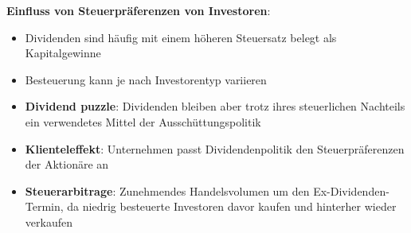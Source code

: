 \bigskip
\textbf{Einfluss von Steuerpräferenzen von Investoren}:
\begin{itemize}
	\item Dividenden sind häufig mit einem höheren Steuersatz belegt als Kapitalgewinne
	\item Besteuerung kann je nach Investorentyp variieren
	\item \textbf{Dividend puzzle}: Dividenden bleiben aber trotz ihres steuerlichen Nachteils ein verwendetes Mittel der Ausschüttungspolitik
	\item \textbf{Klienteleffekt}: Unternehmen passt Dividendenpolitik den Steuerpräferenzen der Aktionäre an
	\item \textbf{Steuerarbitrage}: Zunehmendes Handelsvolumen um den Ex-Dividenden-Termin, da niedrig besteuerte Investoren davor kaufen und hinterher wieder verkaufen
\end{itemize}
\bigskip
